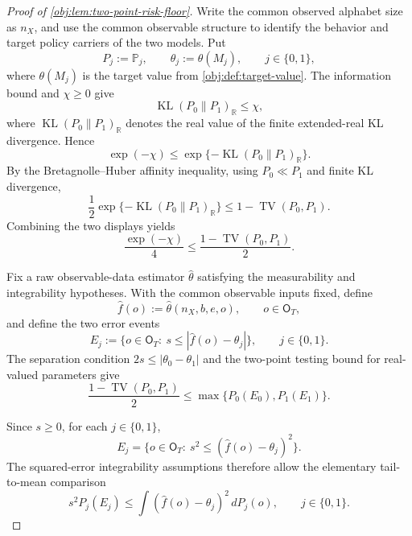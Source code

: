 \documentclass[11pt]{article}
\begin{document}
\begin{proof}[Proof of \cref{obj:lem:two-point-risk-floor}]
Write the common observed alphabet size as \(n_X\), and use the common observable
structure to identify the behavior and target policy carriers of the two models.  Put
\[
P_j:=\mathbb P_j,\qquad
\theta_j:=\theta(M_j),\qquad j\in\{0,1\},
\]
where \(\theta(M_j)\) is the target value from \cref{obj:def:target-value}.  The
information bound and \(\chi\ge0\) give
\[
\operatorname{KL}(P_0\|P_1)_{\mathbb R}\le \chi ,
\]
where \(\operatorname{KL}(P_0\|P_1)_{\mathbb R}\) denotes the real value of the
finite extended-real KL divergence.  Hence
\[
\exp(-\chi)
\le
\exp\{-\operatorname{KL}(P_0\|P_1)_{\mathbb R}\}.
\]
By the Bretagnolle--Huber affinity inequality, using \(P_0\ll P_1\) and finite
KL divergence,
\[
\frac12\exp\{-\operatorname{KL}(P_0\|P_1)_{\mathbb R}\}
\le
1-\operatorname{TV}(P_0,P_1).
\]
Combining the two displays yields
\begin{equation}\label{eq:two-point-risk-floor-affinity}
\frac{\exp(-\chi)}{4}
\le
\frac{1-\operatorname{TV}(P_0,P_1)}{2}.
\end{equation} %

Fix a raw observable-data estimator \(\widehat\theta\) satisfying the measurability
and integrability hypotheses.  With the common observable inputs fixed, define
\[
\widehat f(o):=\widehat\theta(n_X,b,e,o),
\qquad o\in\mathsf O_T,
\]
and define the two error events
\[
E_j:=\{o\in\mathsf O_T:\ s\le |\widehat f(o)-\theta_j|\},
\qquad j\in\{0,1\}.
\]
The separation condition \(2s\le|\theta_0-\theta_1|\) and the two-point testing
bound for real-valued parameters give
\begin{equation}\label{eq:two-point-risk-floor-testing}
\frac{1-\operatorname{TV}(P_0,P_1)}{2}
\le
\max\{P_0(E_0),P_1(E_1)\}.
\end{equation} %

Since \(s\ge0\), for each \(j\in\{0,1\}\),
\[
E_j
=
\{o\in\mathsf O_T:\ s^2\le(\widehat f(o)-\theta_j)^2\}.
\]
The squared-error integrability assumptions therefore allow the elementary
tail-to-mean comparison
\begin{equation}\label{eq:two-point-risk-floor-tail-mean}
s^2 P_j(E_j)
\le
\int(\widehat f(o)-\theta_j)^2\,dP_j(o),
\qquad j\in\{0,1\}.
\end{equation} %


\end{proof}
\end{document}
